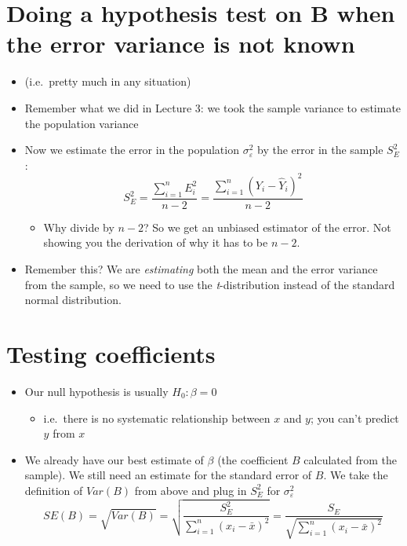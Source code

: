 \documentclass[]{article}
\providecommand{\tightlist}{%
  \setlength{\itemsep}{0pt}\setlength{\parskip}{0pt}}
\begin{document}
\section{Doing a hypothesis test on B when the error variance is not
known}\label{doing-a-hypothesis-test-on-b-when-the-error-variance-is-not-known}

\begin{itemize}
\tightlist
\item
  (i.e.~pretty much in any situation)
\item
  Remember what we did in Lecture 3: we took the sample variance to
  estimate the population variance
\item
  Now we estimate the error in the population \(\sigma_\varepsilon^2\)
  by the error in the sample \(S^2_E\):
  \[S^2_E = \frac{\sum\limits_{i = 1}^{n} E_i^2}{n-2} = \frac{\sum\limits_{i = 1}^{n} (Y_i - \hat{Y}_i)^2}{n-2}\]

  \begin{itemize}
  \tightlist
  \item
    Why divide by \(n-2\)? So we get an unbiased estimator of the error.
    Not showing you the derivation of why it has to be \(n-2\).
  \end{itemize}
\item
  Remember this? We are \emph{estimating} both the mean and the error
  variance from the sample, so we need to use the \emph{t}-distribution
  instead of the standard normal distribution.
\end{itemize}

\section{Testing coefficients}\label{testing-coefficients}

\begin{itemize}
\tightlist
\item
  Our null hypothesis is usually \(H_0: \beta = 0\)

  \begin{itemize}
  \tightlist
  \item
    i.e.~there is no systematic relationship between \(x\) and \(y\);
    you can't predict \(y\) from \(x\)
  \end{itemize}
\item
  We already have our best estimate of \(\beta\) (the coefficient \(B\)
  calculated from the sample). We still need an estimate for the
  standard error of \(B\). We take the definition of \(Var(B)\) from
  above and plug in \(S_E^2\) for \(\sigma_{\varepsilon}^2\)
  \[SE(B) = \sqrt{Var(B)} = \sqrt{\frac{S^2_E}{\sum\limits_{i=1}^{n}(x_i-\bar{x})^2}}= \frac{S_E}{\sqrt{\sum\limits_{i=1}^{n}(x_i-\bar{x})^2}}\]
\end{itemize}
\end{document}
